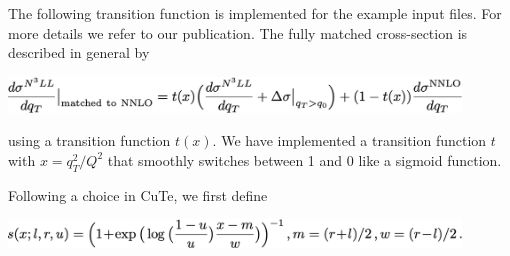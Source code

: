 \hypertarget{plotting-and-transition}{%
	\label{plotting-and-transition}}

The following transition function is implemented for the example
input files. For more details we refer to our publication. The fully
matched cross-section is described in general by 

\includegraphics[width=0.9\textwidth]{./sections/Matching.png}

using a transition function $t(x)$. We have implemented a transition function $t$
with $x=q_T^2/Q^2$ that smoothly switches between 1 and 0 like a sigmoid function.

Following a choice in CuTe, we first define

\includegraphics[width=0.9\textwidth]{./sections/sfunction.png}

